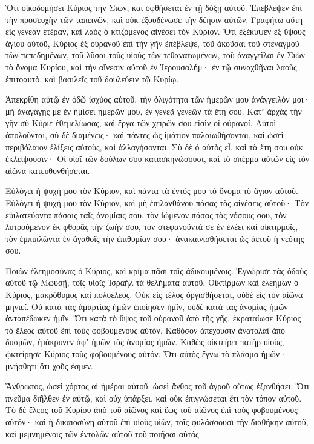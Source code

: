 \begin{spacing}{1.1}
\begin{multicols}{2}
Ὅτι οἰκοδομήσει Κύριος τὴν Σιὼν, καὶ ὀφθήσεται ἐν τῇ δόξῃ αὐτοῦ.
Ἐπέβλεψεν ἐπὶ τὴν προσευχὴν τῶν ταπεινῶν, καὶ οὐκ ἐξουδένωσε τὴν δέησιν αὐτῶν.
Γραφήτω αὕτη εἰς γενεὰν ἑτέραν, καὶ λαὸς ὁ κτιζόμενος αἰνέσει τὸν Κύριον.
Ὅτι ἐξέκυψεν ἐξ ὕψους ἁγίου αὐτοῦ, Κύριος ἐξ οὐρανοῦ ἐπὶ τὴν γῆν ἐπέβλεψε,
τοῦ ἀκοῦσαι τοῦ στεναγμοῦ τῶν πεπεδημένων, τοῦ λῦσαι τοὺς υἱοὺς τῶν τεθανατωμένων,
τοῦ ἀναγγεῖλαι ἐν Σιὼν τὸ ὄνομα Κυρίου, καὶ τὴν αἴνεσιν αὐτοῦ ἐν Ἱερουσαλήμ·
ἐν τῷ συναχθῆναι λαοὺς ἐπιτοαυτὸ, καὶ βασιλεῖς τοῦ δουλεύειν τῷ Κυρίῳ.

Ἀπεκρίθη αὐτῷ ἐν ὁδῷ ἰσχύος αὐτοῦ, τὴν ὀλιγότητα τῶν ἡμερῶν μου ἀνάγγειλόν μοι·
μὴ ἀναγάγῃς με ἐν ἡμίσει ἡμερῶν μου, ἐν γενεᾷ γενεῶν τὰ ἔτη σου.
Κατʼ ἀρχὰς τὴν γῆν σὺ Κύριε ἐθεμελίωσας, καὶ ἔργα τῶν χειρῶν σου εἰσὶν οἱ οὐρανοί.
Αὐτοὶ ἀπολοῦνται, σὺ δὲ διαμένεις· καὶ πάντες ὡς ἱμάτιον παλαιωθήσονται, καὶ ὡσεὶ περιβόλαιον ἑλίξεις αὐτοὺς, καὶ ἀλλαγήσονται.
Σὺ δὲ ὁ αὐτὸς εἶ, καὶ τὰ ἔτη σου οὐκ ἐκλείψουσιν·
Οἱ υἱοῖ τῶν δούλων σου κατασκηνώσουσι, καὶ τὸ σπέρμα αὐτῶν εἰς τὸν αἰῶνα κατευθυνθήσεται.

Εὐλόγει ἡ ψυχή μου τὸν Κύριον, καὶ πάντα τὰ ἐντός μου τὸ ὄνομα τὸ ἅγιον αὐτοῦ.
Εὐλόγει ἡ ψυχή μου τὸν Κύριον, καὶ μὴ ἐπιλανθάνου πάσας τὰς αἰνέσεις αὐτοῦ·
Τὸν εὐιλατεύοντα πάσαις ταῖς ἀνομίαις σου, τὸν ἰώμενον πάσας τὰς νόσους σου,
τὸν λυτρούμενον ἐκ φθορᾶς τὴν ζωήν σου, τὸν στεφανοῦντά σε ἐν ἐλέει καὶ οἰκτιρμοῖς,
τὸν ἐμπιπλῶντα ἐν ἀγαθοῖς τὴν ἐπιθυμίαν σου· ἀνακαινισθήσεται ὡς ἀετοῦ ἡ νεότης σου.

Ποιῶν ἐλεημοσύνας ὁ Κύριος, καὶ κρίμα πᾶσι τοῖς ἀδικουμένοις.
Ἐγνώρισε τὰς ὁδοὺς αὐτοῦ τῷ Μωυσῇ, τοῖς υἱοῖς Ἰσραὴλ τὰ θελήματα αὐτοῦ.
Οἰκτίρμων καὶ ἐλεήμων ὁ Κύριος, μακρόθυμος καὶ πολυέλεος.
Οὐκ εἰς τέλος ὀργισθήσεται, οὐδὲ εἰς τὸν αἰῶνα μηνιεῖ.
Οὐ κατὰ τὰς ἁμαρτίας ἡμῶν ἐποίησεν ἡμῖν, οὐδὲ κατὰ τὰς ἀνομίας ἡμῶν ἀνταπέδωκεν ἡμῖν.
Ὅτι κατὰ τὸ ὕψος τοῦ οὐρανοῦ ἀπὸ τῆς γῆς, ἐκραταίωσε Κύριος τὸ ἔλεος αὐτοῦ ἐπὶ τοὺς φοβουμένους αὐτόν.
Καθόσον ἀπέχουσιν ἀνατολαὶ ἀπὸ δυσμῶν, ἐμάκρυνεν ἀφʼ ἡμῶν τὰς ἀνομίας ἡμῶν.
Καθὼς οἰκτείρει πατὴρ υἱοὺς, ᾠκτείρησε Κύριος τοὺς φοβουμένους αὐτόν.
Ὅτι αὐτὸς ἔγνω τὸ πλάσμα ἡμῶν· μνήσθητι ὅτι χοῦς ἐσμεν.

Ἄνθρωπος, ὡσεὶ χόρτος αἱ ἡμέραι αὐτοῦ, ὡσεὶ ἄνθος τοῦ ἀγροῦ οὕτως ἐξανθήσει.
Ὅτι πνεῦμα διῆλθεν ἐν αὐτῷ, καὶ οὐχ ὑπάρξει, καὶ οὐκ ἐπιγνώσεται ἔτι τὸν τόπον αὐτοῦ.
Τὸ δὲ ἔλεος τοῦ Κυρίου ἀπὸ τοῦ αἰῶνος καὶ ἕως τοῦ αἰῶνος ἐπὶ τοὺς φοβουμένους αὐτόν· καὶ ἡ δικαιοσύνη αὐτοῦ ἐπὶ υἱοὺς υἱῶν,
τοῖς φυλάσσουσι τὴν διαθήκην αὐτοῦ, καὶ μεμνημένοις τῶν ἐντολῶν αὐτοῦ τοῦ ποιῆσαι αὐτάς.


\end{multicols}
\end{spacing}
